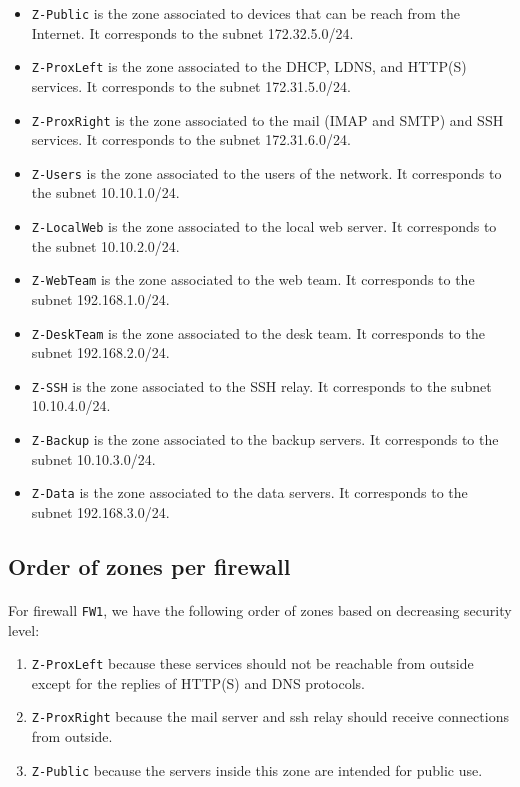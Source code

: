 \documentclass[a4paper, 11pt, oneside]{article}
\begin{document}
\begin{itemize}
\item \texttt{Z-Public} is the zone associated to devices that can be reach from the Internet. It corresponds to the subnet 172.32.5.0/24.
\item \texttt{Z-ProxLeft} is the zone associated to the DHCP, LDNS, and HTTP(S) services. It corresponds to the subnet 172.31.5.0/24.
\item \texttt{Z-ProxRight} is the zone associated to the mail (IMAP and SMTP) and SSH services. It corresponds to the subnet 172.31.6.0/24.
\item \texttt{Z-Users} is the zone associated to the users of the network. It corresponds to the subnet 10.10.1.0/24.
\item \texttt{Z-LocalWeb} is the zone associated to the local web server. It corresponds to the subnet 10.10.2.0/24.
\item \texttt{Z-WebTeam} is the zone associated to the web team. It corresponds to the subnet 192.168.1.0/24.
\item \texttt{Z-DeskTeam} is the zone associated to the desk team. It corresponds to the subnet 192.168.2.0/24.
\item \texttt{Z-SSH} is the zone associated to the SSH relay. It corresponds to the subnet 10.10.4.0/24.
\item \texttt{Z-Backup} is the zone associated to the backup servers. It corresponds to the subnet 10.10.3.0/24.
\item \texttt{Z-Data} is the zone associated to the data servers. It corresponds to the subnet 192.168.3.0/24.
\end{itemize}

\subsection{Order of zones per firewall}
\paragraph{}For firewall \texttt{FW1}, we have the following order of zones based on decreasing security level:
\begin{enumerate}[label={\arabic*)}]
\item \texttt{Z-ProxLeft} because these services should not be reachable from outside except for the replies of HTTP(S) and DNS protocols.
\item \texttt{Z-ProxRight} because the mail server and ssh relay should receive connections from outside.
\item \texttt{Z-Public} because the servers inside this zone are intended for public use.
\end{enumerate}
\end{document}

